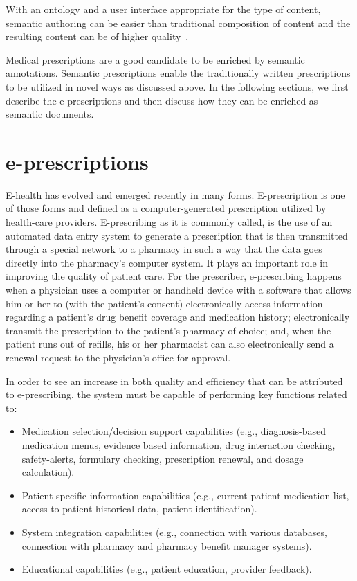 \documentclass[conference]{IEEEtran}
\begin{document}
With an ontology and a user interface appropriate for the type of content, semantic authoring can be easier than traditional composition of content and the resulting content can be of higher quality~\cite{hasida2007}.

Medical prescriptions are a good candidate to be enriched by semantic annotations.
Semantic prescriptions enable the traditionally written prescriptions to be utilized in novel ways as discussed above.
In the following sections, we first describe the e-prescriptions and then discuss how they can be enriched as semantic documents.

\section{e-prescriptions}
\label{sec:epresc}
E-health has evolved and emerged recently in many forms.
E-prescription is one of those forms and defined as a computer-generated prescription utilized by health-care providers.
E-prescribing as it is commonly called, is the use of an automated data entry system to generate a prescription that is then transmitted through a special network to a pharmacy in such a way that the data goes directly into the pharmacy’s computer system.
It plays an important role in improving the quality of patient care.
For the prescriber, e-prescribing happens when a physician uses a computer or handheld device with a software that allows him or her to (with the patient’s consent) electronically access information regarding a patient’s drug benefit coverage and medication history; electronically transmit the prescription to the patient’s pharmacy of choice; and, when the patient runs out of refills, his or her pharmacist can also electronically send a renewal request to the physician’s office for approval.

In order to see an increase in both quality and efficiency that can be attributed to e-prescribing, the system must be capable of performing key functions related to:
\begin{itemize}
  \item Medication selection/decision support capabilities (e.g., diagnosis-based medication menus, evidence based information, drug interaction checking, safety-alerts, formulary checking, prescription renewal, and dosage calculation).
  \item Patient-specific information capabilities (e.g., current patient medication list, access to patient historical data, patient identification).
  \item System integration capabilities (e.g., connection with various databases, connection with pharmacy and pharmacy benefit manager systems).
  \item Educational capabilities (e.g., patient education, provider feedback).
\end{itemize}
\end{document}
